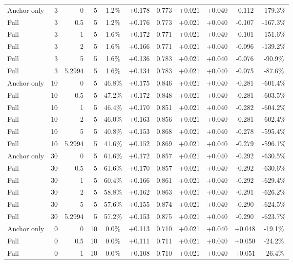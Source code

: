 \begin{table}[htbp]
\begin{tabular}{lrrrccccccc}
Anchor only & 3 & 0 & 5 & 1.2\% & +0.178 & 0.773 & +0.021 & +0.040 & -0.112 & -179.3\% \\
Full & 3 & 0.5 & 5 & 1.2\% & +0.176 & 0.773 & +0.021 & +0.040 & -0.107 & -167.3\% \\
Full & 3 & 1 & 5 & 1.6\% & +0.172 & 0.771 & +0.021 & +0.040 & -0.101 & -151.6\% \\
Full & 3 & 2 & 5 & 1.6\% & +0.166 & 0.771 & +0.021 & +0.040 & -0.096 & -139.2\% \\
Full & 3 & 5 & 5 & 1.6\% & +0.136 & 0.783 & +0.021 & +0.040 & -0.076 & -90.9\% \\
Full & 3 & 5.2994 & 5 & 1.6\% & +0.134 & 0.783 & +0.021 & +0.040 & -0.075 & -87.6\% \\
Anchor only & 10 & 0 & 5 & 46.8\% & +0.175 & 0.846 & +0.021 & +0.040 & -0.281 & -601.4\% \\
Full & 10 & 0.5 & 5 & 47.2\% & +0.172 & 0.848 & +0.021 & +0.040 & -0.281 & -603.5\% \\
Full & 10 & 1 & 5 & 46.4\% & +0.170 & 0.851 & +0.021 & +0.040 & -0.282 & -604.2\% \\
Full & 10 & 2 & 5 & 46.0\% & +0.163 & 0.856 & +0.021 & +0.040 & -0.281 & -602.4\% \\
Full & 10 & 5 & 5 & 40.8\% & +0.153 & 0.868 & +0.021 & +0.040 & -0.278 & -595.4\% \\
Full & 10 & 5.2994 & 5 & 41.6\% & +0.152 & 0.869 & +0.021 & +0.040 & -0.279 & -596.1\% \\
Anchor only & 30 & 0 & 5 & 61.6\% & +0.172 & 0.857 & +0.021 & +0.040 & -0.292 & -630.5\% \\
Full & 30 & 0.5 & 5 & 61.6\% & +0.170 & 0.857 & +0.021 & +0.040 & -0.292 & -630.6\% \\
Full & 30 & 1 & 5 & 60.4\% & +0.166 & 0.861 & +0.021 & +0.040 & -0.292 & -629.4\% \\
Full & 30 & 2 & 5 & 58.8\% & +0.162 & 0.863 & +0.021 & +0.040 & -0.291 & -626.2\% \\
Full & 30 & 5 & 5 & 57.6\% & +0.155 & 0.874 & +0.021 & +0.040 & -0.290 & -624.5\% \\
Full & 30 & 5.2994 & 5 & 57.2\% & +0.153 & 0.875 & +0.021 & +0.040 & -0.290 & -623.7\% \\
Anchor only & 0 & 0 & 10 & 0.0\% & +0.113 & 0.710 & +0.021 & +0.040 & +0.048 & -19.1\% \\
Full & 0 & 0.5 & 10 & 0.0\% & +0.111 & 0.711 & +0.021 & +0.040 & +0.050 & -24.2\% \\
Full & 0 & 1 & 10 & 0.0\% & +0.108 & 0.710 & +0.021 & +0.040 & +0.051 & -26.4\% \\

\end{tabular}
\end{table}
